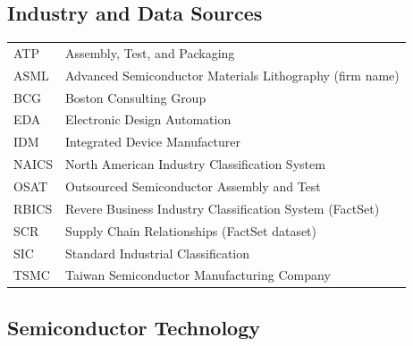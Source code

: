 \subsection*{Industry and Data Sources}

\begin{tabular}{@{}l l@{}}
ATP     & Assembly, Test, and Packaging \\
ASML    & Advanced Semiconductor Materials Lithography (firm name) \\
BCG     & Boston Consulting Group \\
EDA     & Electronic Design Automation \\
IDM     & Integrated Device Manufacturer \\
NAICS   & North American Industry Classification System \\
OSAT    & Outsourced Semiconductor Assembly and Test \\
RBICS   & Revere Business Industry Classification System (FactSet) \\
SCR     & Supply Chain Relationships (FactSet dataset) \\
SIC     & Standard Industrial Classification \\
TSMC    & Taiwan Semiconductor Manufacturing Company \\
\end{tabular}

\subsection*{Semiconductor Technology}

